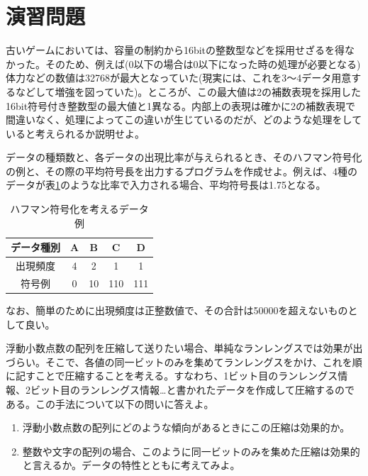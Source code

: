 \section*{演習問題}
\begin{problems}
\item 古いゲームにおいては、容量の制約から16bitの整数型などを採用せざるを得なかった。そのため、例えば(0以下の場合は0以下になった時の処理が必要となる)体力などの数値は32768が最大となっていた(現実には、これを3〜4データ用意するなどして増強を図っていた)。ところが、この最大値は2の補数表現を採用した16bit符号付き整数型の最大値と1異なる。内部上の表現は確かに2の補数表現で間違いなく、処理によってこの違いが生じているのだが、どのような処理をしていると考えられるか説明せよ。 

\item データの種類数と、各データの出現比率が与えられるとき、そのハフマン符号化の例と、その際の平均符号長を出力するプログラムを作成せよ。例えば、4種のデータが表\ref{table1_5}のような比率で入力される場合、平均符号長は1.75となる。
\begin{table}[h]
\centering
\caption{ハフマン符号化を考えるデータ例}\label{table1_5}
\begin{tabular}{|c||c|c|c|c|}\hline
データ種別 & A & B & C & D \\ \hline
出現頻度 & 4 & 2 & 1 & 1 \\ \hline
符号例 & 0 & 10 & 110 & 111 \\ \hline
\end{tabular}
\end{table}
なお、簡単のために出現頻度は正整数値で、その合計は50000を超えないものとして良い。

\item 浮動小数点数の配列を圧縮して送りたい場合、単純なランレングスでは効果が出づらい。そこで、各値の同一ビットのみを集めてランレングスをかけ、これを順に記すことで圧縮することを考える。すなわち、1ビット目のランレングス情報、2ビット目のランレングス情報…と書かれたデータを作成して圧縮するのである。この手法について以下の問いに答えよ。
\begin{enumerate}
\item 浮動小数点数の配列にどのような傾向があるときにこの圧縮は効果的か。
\item 整数や文字の配列の場合、このように同一ビットのみを集めた圧縮は効果的と言えるか。データの特性とともに考えてみよ。
\end{enumerate}

\end{problems}
